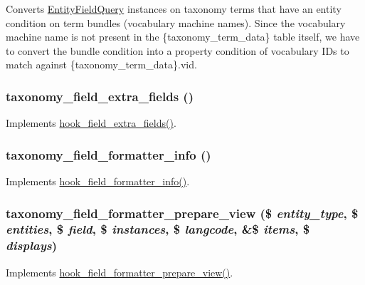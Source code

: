 Converts \hyperlink{classEntityFieldQuery}{EntityFieldQuery} instances on taxonomy terms that have an entity condition on term bundles (vocabulary machine names). Since the vocabulary machine name is not present in the \{taxonomy\_\-term\_\-data\} table itself, we have to convert the bundle condition into a property condition of vocabulary IDs to match against \{taxonomy\_\-term\_\-data\}.vid. \hypertarget{taxonomy_8module_a02fe8c1af0b3d6d760d0ae077d3ec805}{
\subsubsection[{taxonomy\_\-field\_\-extra\_\-fields}]{\setlength{\rightskip}{0pt plus 5cm}taxonomy\_\-field\_\-extra\_\-fields ()}}
\label{taxonomy_8module_a02fe8c1af0b3d6d760d0ae077d3ec805}
Implements \hyperlink{group__hooks_ga7100332aa5b4d5f6ba72534599d133e5}{hook\_\-field\_\-extra\_\-fields()}. \hypertarget{taxonomy_8module_a3fa5b9ed5faf023cc887627f8de00519}{
\subsubsection[{taxonomy\_\-field\_\-formatter\_\-info}]{\setlength{\rightskip}{0pt plus 5cm}taxonomy\_\-field\_\-formatter\_\-info ()}}
\label{taxonomy_8module_a3fa5b9ed5faf023cc887627f8de00519}
Implements \hyperlink{group__field__formatter_ga2f5aa1c7455f55dffd84a48efa57f987}{hook\_\-field\_\-formatter\_\-info()}. \hypertarget{taxonomy_8module_aee141dcf114b33893f92d174fe53a896}{
\subsubsection[{taxonomy\_\-field\_\-formatter\_\-prepare\_\-view}]{\setlength{\rightskip}{0pt plus 5cm}taxonomy\_\-field\_\-formatter\_\-prepare\_\-view (\$ {\em entity\_\-type}, \/  \$ {\em entities}, \/  \$ {\em field}, \/  \$ {\em instances}, \/  \$ {\em langcode}, \/  \&\$ {\em items}, \/  \$ {\em displays})}}
\label{taxonomy_8module_aee141dcf114b33893f92d174fe53a896}
Implements \hyperlink{group__field__formatter_ga2c1856869caa776fd9e5db4af4e0b57b}{hook\_\-field\_\-formatter\_\-prepare\_\-view()}.

